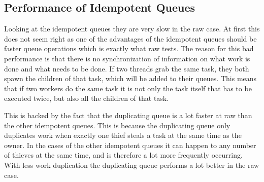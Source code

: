\subsection{Performance of Idempotent Queues}
Looking at the idempotent queues they are very slow in the raw case. At first this does not seem right as one of the advantages of the idempotent queues should be faster queue operations which is exactly what raw tests. The reason for this bad performance is that there is no synchronization of information on what work is done and what needs to be done. If two threads grab the same task, they both spawn the children of that task, which will be added to their queues. This means that if two workers do the same task it is not only the task itself that has to be executed twice, but also all the children of that task.

This is backed by the fact that the duplicating queue is a lot faster at raw than the other idempotent queues. This is because the duplicating queue only duplicates work when exactly one thief steals a task at the same time as the owner. In the cases of the other idempotent queues it can happen to any number of thieves at the same time, and is therefore a lot more frequently occurring. With less work duplication the duplicating queue performs a lot better in the raw case.

